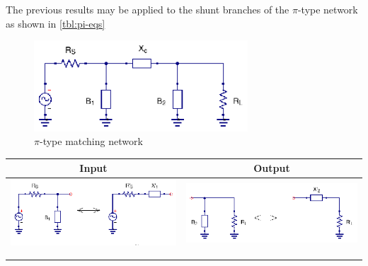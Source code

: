 \noindent The previous results may be applied to the shunt branches of the $\pi$-type network as shown in \ref{tbl:pi-eqs}

\begin{figure}[H]
\centering
\includegraphics[width=80mm]{pi-type-network}
\caption{$\pi$-type matching network}
\label{fig:pi-matching}
\end{figure}

\begin{table}[H]
  \centering
  \begin{tabular}{ | c | c | }
    \hline
    Input & Output\\ \hline
    \begin{minipage}{.4\textwidth}
      \includegraphics[width=\linewidth]{pi-type-input-transform}
    \end{minipage}
    &
    \begin{minipage}{.4\textwidth}
      \includegraphics[width=\linewidth]{pi-type-output-transform}
    \end{minipage}
    \\ \hline
    \begin{minipage}{.4\textwidth}
         {\begin{align}

\end{align}}
\end{minipage}
\end{tabular}
\end{table}
